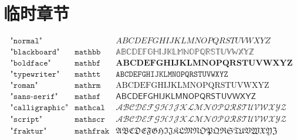 \documentclass[lang=cn,newtx,10pt,scheme=chinese,thmcnt=section]{elegantbook}
\begin{document}
\chapter{临时章节}
\begin{equation}
\begin{array}{ll|l}
	\texttt{"normal"}      &\texttt{}         & ABCDEFGHIJKLMNOPQRSTUVWXYZ\\
	\texttt{"blackboard"}  &\texttt{mathbb}  &\mathbb{ABCDEFGHIJKLMNOPQRSTUVWXYZ}\\
	\texttt{"boldface"}    &\texttt{mathbf}  &\mathbf{ABCDEFGHIJKLMNOPQRSTUVWXYZ}\\
	\texttt{"typewriter"}  &\texttt{mathtt}  &\mathtt{ABCDEFGHIJKLMNOPQRSTUVWXYZ}\\
	\texttt{"roman"}       &\texttt{mathrm}  &\mathrm{ABCDEFGHIJKLMNOPQRSTUVWXYZ}\\
	\texttt{"sans-serif"}  &\texttt{mathsf}  &\mathsf{ABCDEFGHIJKLMNOPQRSTUVWXYZ}\\
	\texttt{"calligraphic"}&\texttt{mathcal} &\mathcal{ABCDEFGHIJKLMNOPQRSTUVWXYZ}\\
	\texttt{"script"}      &\texttt{mathscr} &\mathscr{ABCDEFGHIJKLMNOPQRSTUVWXYZ}\\
	\texttt{"fraktur"}     &\texttt{mathfrak}&\mathfrak{ABCDEFGHIJKLMNOPQRSTUVWXYZ}\\
\end{array}
\end{equation}
\end{document}

